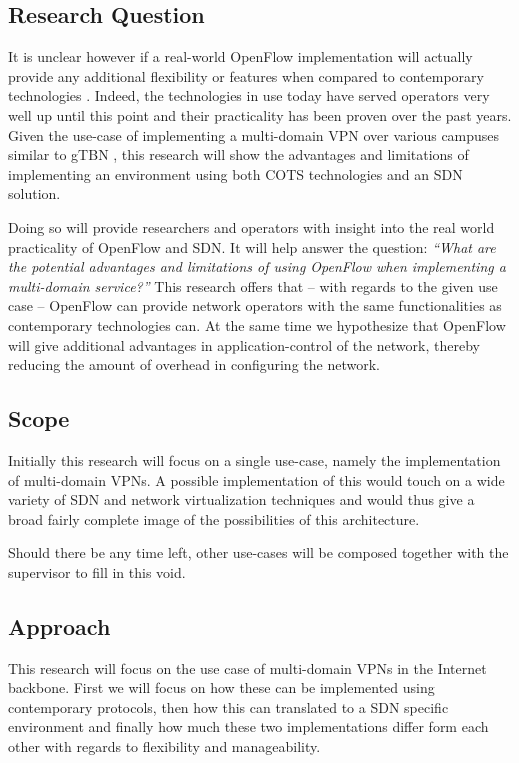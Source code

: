 \documentclass[oneside,twocolumn,8pt,a4paper]{article}
\begin{document}
		\subsection*{Research Question} %
		\label{sub:research_question}
		It is unclear however if a real-world OpenFlow implementation will actually provide any additional flexibility or features when compared to contemporary technologies \cite{programmability-answer}. Indeed, the technologies in use today have served operators very well up until this point and their practicality has been proven over the past years. Given the use-case of implementing a multi-domain VPN over various campuses similar to gTBN \cite{gtbn}, this research will show the advantages and limitations of implementing an environment using both COTS technologies and an SDN solution.
		
		Doing so will provide researchers and operators with insight into the real world practicality of OpenFlow and SDN. It will help answer the question: \textsl{``What are the potential advantages and limitations of using OpenFlow when implementing a multi-domain service?''}
		This research offers that -- with regards to the given use case -- OpenFlow can provide network operators with the same functionalities as contemporary technologies can. At the same time we hypothesize that OpenFlow will give additional advantages in application-control of the network, thereby reducing the amount of overhead in configuring the network.

		
		\subsection*{Scope} %
		\label{sub:scope}
		Initially this research will focus on a single use-case, namely the implementation of multi-domain VPNs. A possible implementation of this would touch on a wide variety of SDN and network virtualization techniques and would thus give a broad fairly complete image of the possibilities of this architecture.
		
		Should there be any time left, other use-cases will be composed together with the supervisor to fill in this void.
		
		\subsection*{Approach} %
		\label{sub:approach}
		This research will focus on the use case of multi-domain VPNs in the Internet backbone. First we will focus on how these can be implemented using contemporary protocols, then how this can translated to a SDN specific environment and finally how much these two implementations differ form each other with regards to flexibility and manageability.
\end{document}
